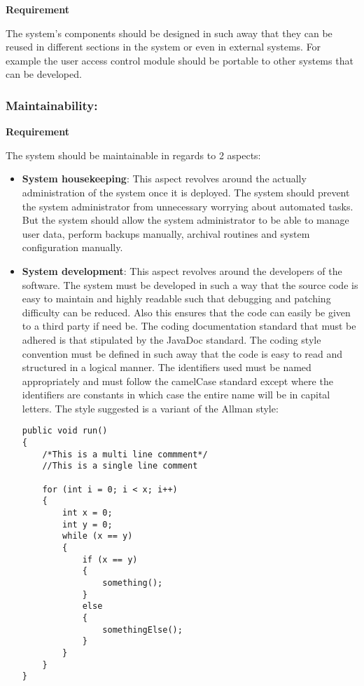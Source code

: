 \begin{flushleft}
\vspace{0.1in}

\textbf{Requirement}

The system's components should be designed in such away that they can be reused in different sections in the system or even in external systems. For example the user access control module should be portable to other systems that can be developed.

\end{flushleft}

\vspace{0.1in}

\vspace{0.2in}
\newpage
\subsubsection{Maintainability:}

\begin{flushleft}
\vspace{0.1in}

\textbf{Requirement}

The system should be maintainable in regards to 2 aspects: 
\begin{itemize}
\item \textbf{System housekeeping}: This aspect revolves around the actually administration of the system once it is deployed. The system should prevent the system administrator from unnecessary worrying about automated tasks. But the system should allow the system administrator to be able to manage user data, perform backups manually, archival routines and system configuration manually. 
\item \textbf{System development}: This aspect revolves around the developers of the software. The system must be developed in such a way that the source code is easy to maintain and highly readable such that debugging and patching difficulty can be reduced. Also this ensures that the code can easily be given to a third party if need be. The coding documentation standard that must be adhered is that stipulated by the JavaDoc standard. The coding style convention must be defined in such away that the code is easy to read and structured in a logical manner. The identifiers used must be named appropriately and must follow the camelCase standard except where the identifiers are constants in which case the entire name will be in capital letters. The style suggested is a variant of the Allman style:
\begin{lstlisting}
public void run()
{
	/*This is a multi line commment*/
	//This is a single line comment
	
	for (int i = 0; i < x; i++)
	{
		int x = 0;
		int y = 0;
		while (x == y)
		{
			if (x == y)
			{
			    something();			    
			}
			else
			{
				somethingElse();
			}
		}
	}
}
\end{lstlisting}
\end{itemize}


\end{flushleft}

\vspace{0.1in}